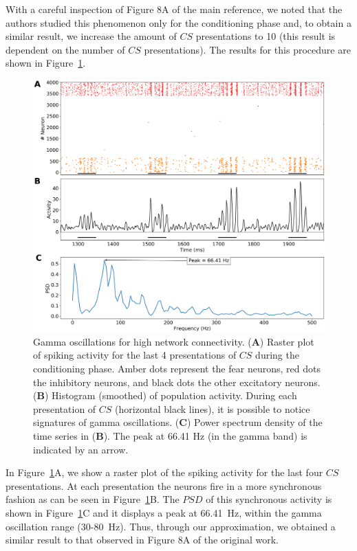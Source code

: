 With a careful inspection of Figure 8A of the main reference, we noted that the authors studied this phenomenon only for the conditioning phase and, to obtain a similar result, we increase the amount of $CS$ presentations to 10 (this result is dependent on the number of $CS$ presentations). The results for this procedure are shown in Figure~\ref{fig:gamma}.

\begin{figure}[!ht]
\centering
\includegraphics[width=1.0\textwidth]{figures/gamma_oscillations.png}
\caption{\label{fig:gamma} Gamma oscillations for high network connectivity. (\textbf{A}) Raster plot of spiking activity for the last 4 presentations of $CS$ during the conditioning phase. Amber dots represent the fear neurons, red dots the inhibitory neurons, and black dots the other excitatory neurons. (\textbf{B}) Histogram (smoothed) of population activity. During each presentation of $CS$ (horizontal black lines), it is possible to notice signatures of gamma oscillations. (\textbf{C}) Power spectrum density of the time series in (\textbf{B}). The peak at 66.41 Hz (in the gamma band) is indicated by an arrow.}
\end{figure}
\FloatBarrier

In Figure~\ref{fig:gamma}A, we show a raster plot of the spiking activity for the last four $CS$ presentations. At each presentation the neurons fire in a more synchronous fashion as can be seen in Figure~\ref{fig:gamma}B. The $PSD$ of this synchronous activity is shown in Figure~\ref{fig:gamma}C and it displays a peak at 66.41~Hz, within the gamma oscillation range (30-80~Hz). Thus, through our approximation, we obtained a similar result to that observed in Figure 8A of the original work.

